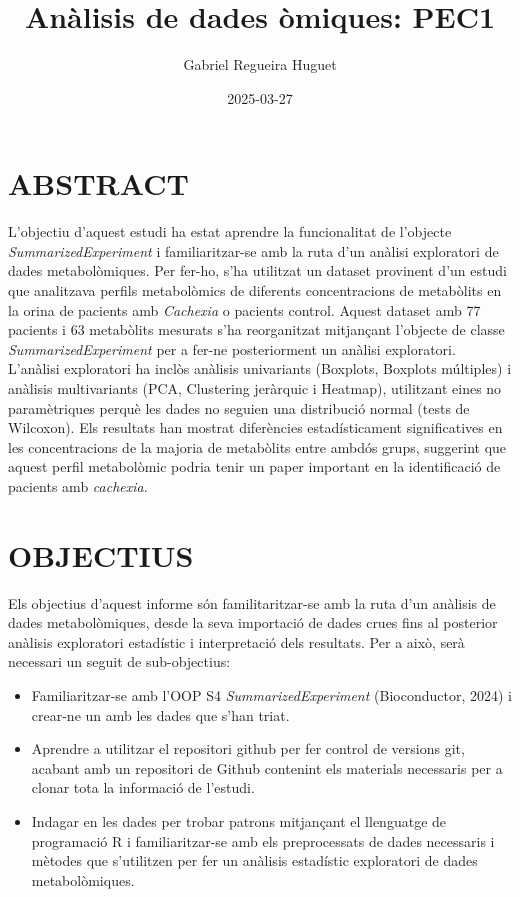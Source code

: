 \documentclass[
]{article}
\title{Anàlisis de dades òmiques: PEC1}
\author{Gabriel Regueira Huguet}
\date{2025-03-27}
\providecommand{\tightlist}{%
  \setlength{\itemsep}{0pt}\setlength{\parskip}{0pt}}
\begin{document}
\maketitle

{
\setcounter{tocdepth}{2}
\tableofcontents
}
\section{ABSTRACT}\label{abstract}

L'objectiu d'aquest estudi ha estat aprendre la funcionalitat de
l'objecte \emph{SummarizedExperiment} i familiaritzar-se amb la ruta
d'un anàlisi exploratori de dades metabolòmiques. Per fer-ho, s'ha
utilitzat un dataset provinent d'un estudi que analitzava perfils
metabolòmics de diferents concentracions de metabòlits en la orina de
pacients amb \emph{Cachexia} o pacients control. Aquest dataset amb 77
pacients i 63 metabòlits mesurats s'ha reorganitzat mitjançant l'objecte
de classe \emph{SummarizedExperiment} per a fer-ne posteriorment un
anàlisi exploratori. L'anàlisi exploratori ha inclòs anàlisis
univariants (Boxplots, Boxplots múltiples) i anàlisis multivariants
(PCA, Clustering jeràrquic i Heatmap), utilitzant eines no paramètriques
perquè les dades no seguien una distribució normal (tests de Wilcoxon).
Els resultats han mostrat diferències estadísticament significatives en
les concentracions de la majoria de metabòlits entre ambdós grups,
suggerint que aquest perfil metabolòmic podria tenir un paper important
en la identificació de pacients amb \emph{cachexia}.

\section{OBJECTIUS}\label{objectius}

Els objectius d'aquest informe són familitaritzar-se amb la ruta d'un
anàlisis de dades metabolòmiques, desde la seva importació de dades
crues fins al posterior anàlisis exploratori estadístic i interpretació
dels resultats. Per a això, serà necessari un seguit de sub-objectius:

\begin{itemize}
\tightlist
\item
  Familiaritzar-se amb l'OOP S4 \emph{SummarizedExperiment}
  (Bioconductor, 2024) i crear-ne un amb les dades que s'han triat.
\item
  Aprendre a utilitzar el repositori github per fer control de versions
  git, acabant amb un repositori de Github contenint els materials
  necessaris per a clonar tota la informació de l'estudi.
\item
  Indagar en les dades per trobar patrons mitjançant el llenguatge de
  programació R i familiaritzar-se amb els preprocessats de dades
  necessaris i mètodes que s'utilitzen per fer un anàlisis estadístic
  exploratori de dades metabolòmiques.
\end{itemize}
\end{document}
